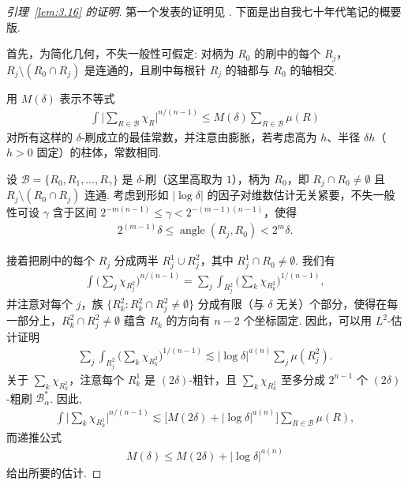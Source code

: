 \begin{proof}[引理~\ref{lem:3.16} 的证明]
第一个发表的证明见 \cite{b77}. 下面是出自我七十年代笔记的概要版.

首先，为简化几何，不失一般性可假定: 对柄为 $R_0$ 的刷中的每个 $R_j$，$R_j \setminus (R_0 \cap R_j)$ 是连通的，且刷中每根针 $R_j$ 的轴都与 $R_0$ 的轴相交.

用 $M(\delta)$ 表示不等式
\begin{align*}
  \int\Big|\sum_{R\in\mathcal{B}}\chi_{R}\Big|^{n/(n-1)}
  \leq M(\delta)\sum_{R\in\mathcal{B}}\mu(R)
\end{align*}
对所有这样的 $\delta$-刷成立的最佳常数，并注意由膨胀，若考虑高为 $h$、半径 $\delta h$（$h > 0$ 固定）的柱体，常数相同.

设 $\mathcal{B} = \{R_0, R_1, \ldots, R_\gamma\}$ 是 $\delta$-刷（这里高取为 $1$），柄为 $R_0$，即 $R_j \cap R_0 \neq \emptyset$ 且 $R_j \setminus (R_0 \cap R_j)$ 连通. 考虑到形如 $|\log \delta|$ 的因子对维数估计无关紧要，不失一般性可设 $\gamma$ 含于区间 $2^{-m(n-1)} \leq \gamma < 2^{-(m-1)(n-1)}$，使得
\begin{align*}
  2^{(m-1)}\delta\leq\operatorname{angle}(R_{j},R_{0})<2^{m}\delta.
\end{align*}

接着把刷中的每个 $R_j$ 分成两半 $R_j^1 \cup R_j^2$，其中 $R_j^1 \cap R_0 \neq \emptyset$. 我们有
\begin{align*}
  \int\Big(\sum_{j}\chi_{R_{j}^{2}}\Big)^{n/(n-1)}
  =\sum_{j}\int_{R_{j}^{2}}\Big(\sum_{k}\chi_{R_{k}^{2}}\Big)^{1/(n-1)},
\end{align*}
并注意对每个 $j$，族 $\{R_k^2 : R_k^2 \cap R_j^2 \neq \emptyset\}$ 分成有限（与 $\delta$ 无关）个部分，使得在每一部分上，$R_k^2 \cap R_j^2 \neq \emptyset$ 蕴含 $R_k$ 的方向有 $n - 2$ 个坐标固定. 因此，可以用 $L^2$-估计证明
\begin{align*}
  \sum_{j}\int_{R_{j}^{2}}\Big(\sum_{k}\chi_{R_{k}^{2}}\Big)^{1/(n-1)}
  \lesssim|\log\delta|^{a(n)}\sum_{j}\mu(R_{j}^{2}).
\end{align*}
关于 $\sum_{k}\chi_{R_k^1}$，注意每个 $R_k^1$ 是 $(2\delta)$-粗针，且 $\sum_{k}\chi_{R_k^1}$ 至多分成 $2^{n-1}$ 个 $(2\delta)$-粗刷 $\mathcal{B}_\alpha^*$. 因此,
\begin{align*}
  \int\Big|\sum_{k}\chi_{R_{k}^{1}}\Big|^{n/(n-1)}
  \lesssim\big[M(2\delta)+|\log\delta|^{a(n)}\big]\sum_{R\in\mathcal{B}}\mu(R),
\end{align*}
而递推公式
\begin{align*}
  M(\delta)\leq M(2\delta)+|\log\delta|^{a(n)}
\end{align*}
给出所要的估计.
\end{proof}

